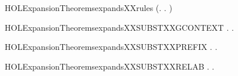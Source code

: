 \begin{SaveVerbatim}{HOLExpansionTheoremsexpandsXXrules}
       (\HOLSymConst{\HOLTokenForall{}}.  \HOLTokenTransBegin\HOLConst{\ensuremath{\tau}}\HOLTokenTransEnd {} \HOLSymConst{\HOLTokenImp{}} \HOLSymConst{\HOLTokenExists{}}.  \HOLTokenWeakTransBegin\HOLConst{\ensuremath{\tau}}\HOLTokenWeakTransEnd {} \HOLSymConst{\HOLTokenConj{}}   ) \HOLSymConst{\HOLTokenImp{}}
         
\end{SaveVerbatim}
\newcommand{\HOLExpansionTheoremsexpandsXXrules}{\UseVerbatim{HOLExpansionTheoremsexpandsXXrules}}
\begin{SaveVerbatim}{HOLExpansionTheoremsexpandsXXSUBSTXXGCONTEXT}
\HOLTokenTurnstile{} \HOLSymConst{\HOLTokenForall{}} .    \HOLSymConst{\HOLTokenImp{}} \HOLSymConst{\HOLTokenForall{}}.   \HOLSymConst{\HOLTokenImp{}}     
\end{SaveVerbatim}
\newcommand{\HOLExpansionTheoremsexpandsXXSUBSTXXGCONTEXT}{\UseVerbatim{HOLExpansionTheoremsexpandsXXSUBSTXXGCONTEXT}}
\begin{SaveVerbatim}{HOLExpansionTheoremsexpandsXXSUBSTXXPREFIX}
\HOLTokenTurnstile{} \HOLSymConst{\HOLTokenForall{}} .    \HOLSymConst{\HOLTokenImp{}} \HOLSymConst{\HOLTokenForall{}}.   
\end{SaveVerbatim}
\newcommand{\HOLExpansionTheoremsexpandsXXSUBSTXXPREFIX}{\UseVerbatim{HOLExpansionTheoremsexpandsXXSUBSTXXPREFIX}}
\begin{SaveVerbatim}{HOLExpansionTheoremsexpandsXXSUBSTXXRELAB}
\HOLTokenTurnstile{} \HOLSymConst{\HOLTokenForall{}} .    \HOLSymConst{\HOLTokenImp{}} \HOLSymConst{\HOLTokenForall{}}.       
\end{SaveVerbatim}
\newcommand{\HOLExpansionTheoremsexpandsXXSUBSTXXRELAB}{\UseVerbatim{HOLExpansionTheoremsexpandsXXSUBSTXXRELAB}}
